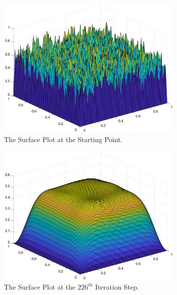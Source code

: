 \documentclass [a4paper, 12pt]{article}
\begin{document}
\begin {figure} [h!]
\centering
\begin {subfigure} [b] {0.3\linewidth}
      \includegraphics [width=\linewidth] {initial.eps}
      \caption {The Surface Plot at the Starting Point.}
\end {subfigure}
\begin {subfigure} [b] {0.3\linewidth}
      \includegraphics [width=\linewidth] {226.eps}
      \caption {The Surface Plot at the $226^{th}$ Iteration Step.}
\end {subfigure}
\begin {subfigure} [b] {0.3\linewidth}

\end{subfigure}
\end{figure}
\end{document}
